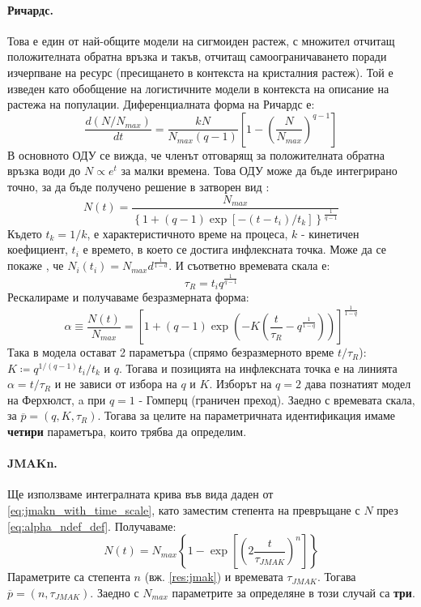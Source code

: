 \paragraph{Ричардс.} Това е един от най-общите модели на сигмоиден растеж, с множител отчитащ положителната обратна връзка и такъв, отчитащ самоограничаването поради изчерпване на ресурс (пресищането в контекста на кристалния растеж). Той е изведен като обобщение на логистичните модели в контекста на описание на растежа на популации. Диференциалната форма на Ричардс е:
\begin{equation}
    \label{eq:richards_diff_form}
    \frac{d(N/N_{max})}{dt} = \frac{k N}{N_{max}(q-1)}\left[ 1 - \left(\frac{N}{N_{max}}\right)^{q-1} \right]
\end{equation}
В основното ОДУ се вижда, че членът отговарящ за положителната обратна връзка води до $N \propto e^t$ за малки времена. Това ОДУ може да бъде интегрирано точно, за да бъде получено решение в затворен вид \cite{Richards1959}:
\begin{equation}
    \label{eq:richards_int_form}
    N(t) = \frac{N_{max}}{\left\{1 + (q-1)\exp{\left[ - (t-t_{i})/t_k \right]}\right\}^{\frac{1}{q-1}}}
\end{equation}
Където $t_k = 1/k$, е характеристичното време на процеса, $k$ - кинетичен коефициент, $t_{i}$ е времето, в което се достига инфлексната точка. Може да се покаже \cite{Tjrve2010}, че $N_i (t_i) = N_{max} d ^ {\frac{1}{1-d}}$. И съответно времевата скала е:
\begin{equation*}
    \tau_R = t_i q ^ {\frac{1}{q-1}}
\end{equation*}
Рескалираме и получаваме безразмерната форма:
\begin{equation*}
    \alpha \equiv \frac{N(t)}{N_{max}} = \left[ 1 + (q-1) \exp{\left( -K \left( \frac{t}{\tau_R} - q ^ {\frac{1}{1-q}} \right) \right)} \right] ^ {\frac{1}{1-q}}
\end{equation*}
Така в модела остават 2 параметъра (спрямо безразмерното време $t/\tau_R$): $K \coloneqq q^{1/(q-1)} t_i / t_k$ и $q$. Тогава и позицията на инфлексната точка е на линията $\alpha = t/\tau_R$ и не зависи от избора на $q$ и $K$.
Изборът на $q = 2$ дава познатият модел на Ферхюлст, a при $q = 1$ - Гомперц (граничен преход). Заедно с времевата скала, за
$\overline{p} = (q, K, \tau_R)$. Тогава за целите на параметричната идентификация имаме \textbf{четири} параметъра, които трябва да определим.

\paragraph{JMAKn.} Ще използваме интегралната крива във вида даден от \autoref{eq:jmakn_with_time_scale}, като заместим степента на превръщане с $N$ през \autoref{eq:alpha_ndef_def}. Получаваме:
\begin{equation}
    \label{eq:jmakn_intform_n}
    N(t) = N_{max} \left\{ 1 - \exp{\left[  \left( 2 \frac{t}{\tau_{JMAK}} \right)^n \right]} \right\}
\end{equation}
Параметрите са степента $n$ (вж. \autoref{res:jmak}) и времевата $\tau_{JMAK}$. Тогава $\overline{p} = (n, \tau_{JMAK})$. Заедно с $N_{max}$ параметрите за определяне в този случай са \textbf{три}.

